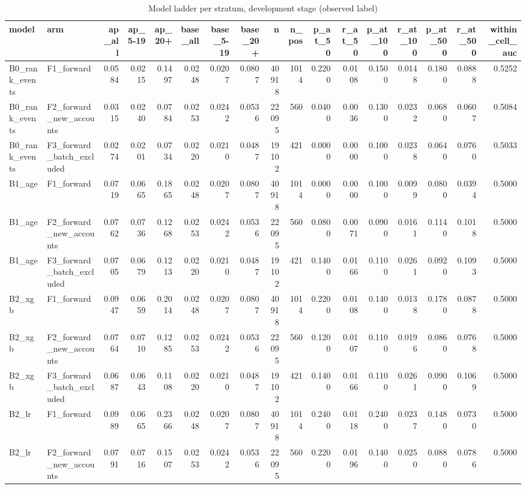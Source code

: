 \begin{table}
\caption{Model ladder per stratum, development stage (observed label)}
\label{tab:tab_models_by_stratum}
\begin{tabular}{llrrrrrrrrrrrrrrr}
\toprule
model & arm & ap\_all & ap\_5-19 & ap\_20+ & base\_all & base\_5-19 & base\_20+ & n & n\_pos & p\_at\_50 & r\_at\_50 & p\_at\_100 & r\_at\_100 & p\_at\_500 & r\_at\_500 & within\_cell\_auc \\
\midrule
B0\_rank\_events & F1\_forward & 0.0584 & 0.0215 & 0.1497 & 0.0248 & 0.0207 & 0.0807 & 40918 & 1014 & 0.2200 & 0.0108 & 0.1500 & 0.0148 & 0.1800 & 0.0888 & 0.5252 \\
B0\_rank\_events & F2\_forward\_new\_accounts & 0.0315 & 0.0240 & 0.0784 & 0.0253 & 0.0242 & 0.0536 & 22095 & 560 & 0.0400 & 0.0036 & 0.1300 & 0.0232 & 0.0680 & 0.0607 & 0.5084 \\
B0\_rank\_events & F3\_forward\_batch\_excluded & 0.0274 & 0.0201 & 0.0734 & 0.0220 & 0.0210 & 0.0487 & 19102 & 421 & 0.0000 & 0.0000 & 0.1000 & 0.0238 & 0.0640 & 0.0760 & 0.5033 \\
B1\_age & F1\_forward & 0.0719 & 0.0665 & 0.1865 & 0.0248 & 0.0207 & 0.0807 & 40918 & 1014 & 0.0000 & 0.0000 & 0.1000 & 0.0099 & 0.0800 & 0.0394 & 0.5000 \\
B1\_age & F2\_forward\_new\_accounts & 0.0762 & 0.0736 & 0.1268 & 0.0253 & 0.0242 & 0.0536 & 22095 & 560 & 0.0800 & 0.0071 & 0.0900 & 0.0161 & 0.1140 & 0.1018 & 0.5000 \\
B1\_age & F3\_forward\_batch\_excluded & 0.0705 & 0.0679 & 0.1213 & 0.0220 & 0.0210 & 0.0487 & 19102 & 421 & 0.1400 & 0.0166 & 0.1100 & 0.0261 & 0.0920 & 0.1093 & 0.5000 \\
B2\_xgb & F1\_forward & 0.0947 & 0.0659 & 0.2014 & 0.0248 & 0.0207 & 0.0807 & 40918 & 1014 & 0.2200 & 0.0108 & 0.1400 & 0.0138 & 0.1780 & 0.0878 & 0.5000 \\
B2\_xgb & F2\_forward\_new\_accounts & 0.0764 & 0.0710 & 0.1285 & 0.0253 & 0.0242 & 0.0536 & 22095 & 560 & 0.1200 & 0.0107 & 0.1100 & 0.0196 & 0.0860 & 0.0768 & 0.5000 \\
B2\_xgb & F3\_forward\_batch\_excluded & 0.0687 & 0.0643 & 0.1108 & 0.0220 & 0.0210 & 0.0487 & 19102 & 421 & 0.1400 & 0.0166 & 0.1100 & 0.0261 & 0.0900 & 0.1069 & 0.5000 \\
B2\_lr & F1\_forward & 0.0989 & 0.0665 & 0.2366 & 0.0248 & 0.0207 & 0.0807 & 40918 & 1014 & 0.2400 & 0.0118 & 0.2400 & 0.0237 & 0.1480 & 0.0730 & 0.5000 \\
B2\_lr & F2\_forward\_new\_accounts & 0.0791 & 0.0716 & 0.1507 & 0.0253 & 0.0242 & 0.0536 & 22095 & 560 & 0.2200 & 0.0196 & 0.1400 & 0.0250 & 0.0880 & 0.0786 & 0.5000 \\

\end{tabular}
\end{table}
